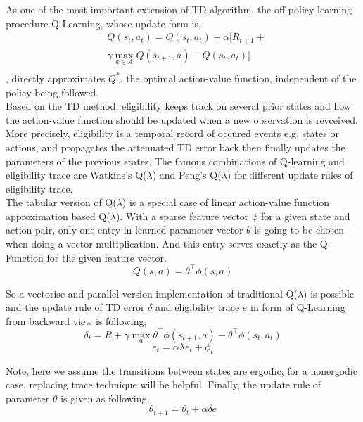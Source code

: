 \documentclass[conference]{IEEEtran}
\begin{document}
As one of the most important extension of TD algorithm, the off-policy learning procedure Q-Learning\cite{watkins1992q}, whose update form is,
\begin{equation}
  \begin{split}
    &Q(s_t, a_t) = Q(s_t, a_t) + \alpha [R_{t+1} + \\
    &\gamma \max_{a\in A}Q(s_{t+1}, a) - Q(s_t, a_t)]\\
  \end{split}  
\end{equation}
, directly approximates $Q^*$, the optimal action-value function, independent of the policy being followed.\\

Based on the TD method, eligibility keeps track on several prior states and how the action-value function should be updated when a new observation is revceived. More precisely, eligibility is a temporal record of occured events e.g. states or actions, and propagates the attenuated TD error back then finally updates the parameters of the previous states. The famous combinations of Q-learning and eligibility trace are Watkins’s Q($\lambda$) \cite{watkins1992q} and Peng’s Q($\lambda$) \cite{peng1996incremental} for different update rules of eligibility trace. \\

The tabular version of Q($\lambda$) is a special case of linear action-value function approximation based Q($\lambda$). With a sparse feature vector $\phi$ for a given state and action pair, only one entry in learned parameter vector $\theta$ is going to be chosen when doing a vector multiplication. And this entry serves exactly as the Q-Function for the given feature vector.
\begin{equation}
  Q(s, a) = \theta^\top  \phi(s, a)
\end{equation}

So a vectorise and parallel version implementation of traditional Q($\lambda$) is possible and the update rule of TD error $\delta$ and eligibility trace $e$ in form of Q-Learning from backward view is following,
\begin{equation}
  \delta_t = R + \gamma \max_a \theta^\top  \phi(s_{t+1}, a) - \theta^\top  \phi(s_t, a_t)
\end{equation}
\begin{equation}
  e_t = \alpha \lambda e_t + \phi_t
\end{equation}

Note, here we assume the transitions between states are ergodic, for a nonergodic case, replacing trace technique will be helpful. Finally, the update rule of parameter $\theta$ is given as following,
\begin{equation}
  \theta_{t+1} = \theta_t + \alpha \delta e
\end{equation}
\end{document}
